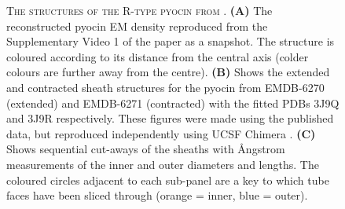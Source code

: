 \begin{figure}[p]
	\caption[Resolved R-type Pyocin Structures from \cite{Ge2015}]{\textsc{\normalsize The structures of the R-type pyocin from \cite{Ge2015}.}\vspace{0.1cm} \newline \textbf{(A)} The reconstructed pyocin EM density reproduced from the Supplementary Video 1 of the \cite{Ge2015} paper as a snapshot. The structure is coloured according to its distance from the central axis (colder colours are further away from the centre). \textbf{(B)} Shows the extended and contracted sheath structures for the pyocin from EMDB-6270 (extended) and EMDB-6271 (contracted) with the fitted PDBs 3J9Q and 3J9R respectively. These figures were made using the published data, but reproduced independently using UCSF Chimera \citep{Pettersen2004}. \textbf{(C)} Shows sequential cut-aways of the sheaths with \AA{}ngstrom measurements of the inner and outer diameters and lengths. The coloured circles adjacent to each sub-panel are a key to which tube faces have been sliced through (orange = inner, blue = outer).}
	\label{pyocinstructure}
\end{figure}

\clearpage


